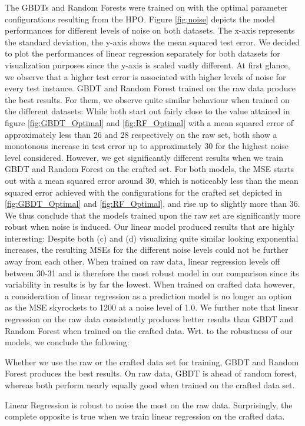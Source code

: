 The GBDTs and Random Forests were trained on with the optimal parameter configurations resulting from the HPO. Figure \ref{fig:noise} depicts the model performances for different levels of noise on both datasets. The x-axis represents the standard deviation, the y-axis shows the mean squared test error. We decided to plot the performances of linear regression separately for both datasets for visualization purposes since the y-axis is scaled vastly different. At first glance, we observe that a higher test error is associated with higher levels of noise for every test instance. GBDT and Random Forest trained on the raw data produce the best results. For them, we observe quite similar behaviour when trained on the different datasets: While both start out fairly close to the value attained in figure \ref{fig:GBDT_Optimal} and \ref{fig:RF_Optimal} with a mean squared error of approximately less than 26 and 28 respectively on the raw set, both show a monotonous increase in test error up to approximately 30 for the highest noise level considered. However, we get significantly different results when we train GBDT and Random Forest on the crafted set. For both models, the MSE starts out with a mean squared error around 30, which is noticeably less than the mean squared error achieved with the configurations for the crafted set depicted in \ref{fig:GBDT_Optimal} and \ref{fig:RF_Optimal}, and rise up to slightly more than 36. We thus conclude that the models trained upon the raw set are significantly more robust when noise is induced. Our linear model produced results that are highly interesting: Despite both (c) and (d) visualizing quite similar looking exponential increases, the resulting MSEs for the different noise levels could not be further away from each other. When trained on raw data, linear regression levels off between 30-31 and is therefore the most robust model in our comparison since its variability in results is by far the lowest. When trained on crafted data however, a consideration of linear regression as a prediction model is no longer an option as the MSE skyrockets to 1200 at a noise level of 1.0. We further note that linear regression on the raw data consistently produces better results than GBDT and Random Forest when trained on the crafted data. 
Wrt. to the robustness of our models, we conclude the following:
\begin{description}[font=$\bullet$\scshape\bfseries]
	\item Whether we use the raw or the crafted data set for training, GBDT and Random Forest produces the best results. On raw data, GBDT is ahead of random forest, whereas both perform nearly equally good when trained on the crafted data set. 
	\item Linear Regression is robust to noise the most on the raw data. Surprisingly, the complete opposite is true when we train linear regression on the crafted data. 
\end{description}
